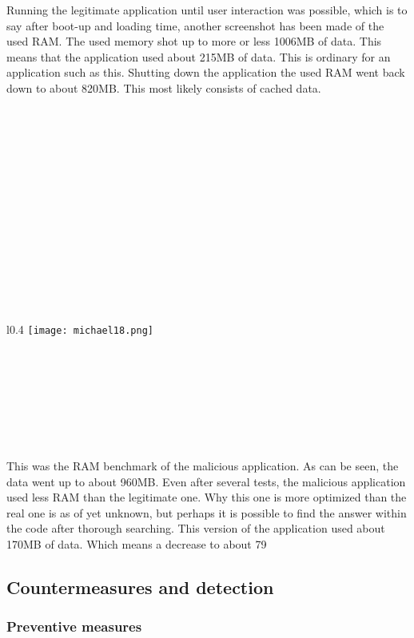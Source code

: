 {{{{\begin{minipage}{\linewidth}
Running the legitimate application until user interaction was possible, which is to say after boot-up and loading time, another screenshot has been made of the used RAM. The used memory shot up to more or less 1006MB of data. This means that the application used about 215MB of data. This is ordinary for an application such as this. Shutting down the application the used RAM went back down to about 820MB. This most likely consists of cached data.
\end{minipage}
~\\
~\\
~\\
~\\
~\\
~\\
~\\
~\\
~\\
~\\
~\\
~\\
~\\

\begin{minipage}{\linewidth}
\begin{wrapfigure}{l}{0.4\textwidth}
\centering
\texttt{[image: michael18.png]}
\end{wrapfigure}
~\\
~\\
~\\
~\\
~\\
~\\
~\\

This was the RAM benchmark of the malicious application. As can be seen, the data went up to about 960MB. Even after several tests, the malicious application used less RAM than the legitimate one. Why this one is more optimized than the real one is as of yet unknown, but perhaps it is possible to find the answer within the code after thorough searching. This version of the application used about 170MB of data. Which means a decrease to about 79%
\end{minipage}

\newpage
\subsection{Countermeasures and detection}

\subsubsection{Preventive measures}

}}}}
